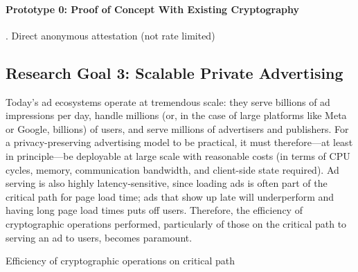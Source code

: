 \paragraph{Prototype 0: Proof of Concept With Existing Cryptography}.
Direct anonymous attestation (not rate limited)


\subsection{Research Goal 3: Scalable Private Advertising}
\label{s:rg3}

%
Today's ad ecosystems operate at tremendous scale: they serve billions of ad impressions per day, handle millions (or, in the case of large platforms like Meta or Google, billions) of users, and serve millions of advertisers and publishers.
%
For a privacy-preserving advertising model to be practical, it must therefore---at least in principle---be deployable at large scale with reasonable costs (in terms of CPU cycles, memory, communication bandwidth, and client-side state required).
%
Ad serving is also highly latency-sensitive, since loading ads is often part of the critical path for page load time; ads that show up late will underperform and having long page load times puts off users.
%
Therefore, the efficiency of cryptographic operations performed, particularly of those on the critical path to serving an ad to users, becomes paramount.
%

Efficiency of cryptographic operations on critical path
